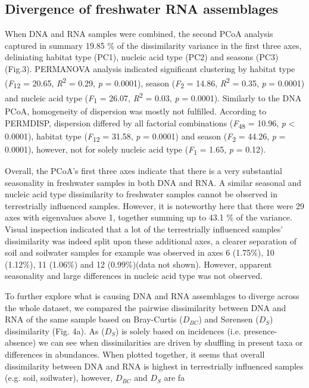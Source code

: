 \documentclass[12pt,a4paper]{article} %
\begin{document}
\subsection*{Divergence of freshwater RNA assemblages}
When DNA and RNA samples were combined, the second PCoA analysis captured in summary 19.85 \% of the dissimilarity variance in the first three axes, deliniating habitat type (PC1), nucleic acid type (PC2) and seasons (PC3)(Fig.3). PERMANOVA analysis indicated significant clustering by habitat type (\textit{F}\textsubscript{12} = 20.65, \textit{R}\textsuperscript{2} = 0.29, \textit{p} = 0.0001), season (\textit{F}\textsubscript{2} = 14.86, \textit{R}\textsuperscript{2} = 0.35, \textit{p} = 0.0001) and nucleic acid type (\textit{F}\textsubscript{1} = 26.07, \textit{R}\textsuperscript{2} = 0.03, \textit{p} = 0.0001). Similarly to the DNA PCoA, homogeneity of dispersion was mostly not fulfilled. According to PERMDISP, dispersion differed by all factorial combinations (\textit{F}\textsubscript{48} = 10.96, \textit{p} < 0.0001), habitat type (\textit{F}\textsubscript{12} = 31.58, \textit{p} = 0.0001) and season (\textit{F}\textsubscript{2} = 44.26, \textit{p} = 0.0001), however, not for solely nucleic acid type (\textit{F}\textsubscript{1} = 1.65, \textit{p} = 0.12).

Overall, the PCoA's first three axes indicate that there is a very substantial seasonality in freshwater samples in both DNA and RNA. A similar seasonal and nucleic acid type dissimilarity to freshwater samples cannot be observed in terrestrially influenced samples. However, it is noteworthy here that there were 29 axes with eigenvalues above 1, together summing up to 43.1 \% of the variance. Visual inspection indicated that a lot of the terrestrially influenced samples' dissimilarity was indeed split upon these additional axes, a clearer separation of soil and soilwater samples for example was observed in axes 6 (1.75\%), 10 (1.12\%), 11 (1.06\%) and 12 (0.99\%)(data not shown). However, apparent seasonality and large differences in nucleic acid type was not observed.

To further explore what is causing DNA and RNA assemblages to diverge across the whole dataset, we compared the pairwise dissimilarity between DNA and RNA of the same sample based on Bray-Curtis ($D_{BC}$) and S{\o}rensen ($D_{S}$) dissimilarity (Fig. 4a). As ($D_{S}$) is solely based on incidences (i.e. presence-absence) we can see when dissimilarities are driven by shuffling in present taxa or differences in abundances. When plotted together, it seems that overall dissimilarity between DNA and RNA is highest in terrestrially influenced samples (e.g. soil, soilwater), however, $D_{BC}$ and $D_{S}$ are fa
\end{document}
